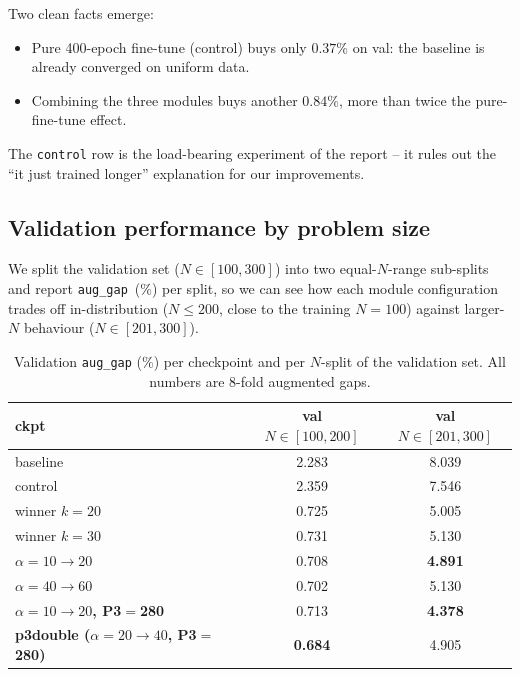 \documentclass[11pt,a4paper]{article}
\begin{document}
Two clean facts emerge:
%
\begin{itemize}
  \item Pure 400-epoch fine-tune (control) buys only $0.37\%$ on val: the
        baseline is already converged on uniform data.
  \item Combining the three modules buys another $0.84\%$, more than twice
        the pure-fine-tune effect.
\end{itemize}
%
The \texttt{control} row is the load-bearing experiment of the report -- it
rules out the ``it just trained longer'' explanation for our improvements.

\subsection{Validation performance by problem size}
\label{sec:bucket}

We split the validation set ($N\!\in\![100,300]$) into two
equal-$N$-range sub-splits and report \texttt{aug\_gap}~($\%$) per split,
so we can see how each module configuration trades off in-distribution
($N\!\le\!200$, close to the training $N\!=\!100$) against larger-$N$
behaviour ($N\!\in\![201,300]$).

\begin{table}[t]
\centering
\caption{Validation \texttt{aug\_gap} ($\%$) per checkpoint and per
$N$-split of the validation set. All numbers are 8-fold augmented gaps.}
\label{tab:bucket}
\small
\begin{tabular}{l c c}
\toprule
ckpt                    & val $N\!\in\![100,200]$ & val $N\!\in\![201,300]$ \\
\midrule
baseline                & 2.283 & 8.039 \\
control                 & 2.359 & 7.546 \\
\midrule
winner $k\!=\!20$       & 0.725 & 5.005 \\
winner $k\!=\!30$       & 0.731 & 5.130 \\
$\alpha\!=\!10\!\to\!20$ & 0.708 & \textbf{4.891} \\
$\alpha\!=\!40\!\to\!60$ & 0.702 & 5.130 \\
\rowcolor{sdmblue!10}
\textbf{$\alpha\!=\!10\!\to\!20$, P3$=$280} & 0.713 & \textbf{4.378} \\
\textbf{p3double ($\alpha\!=\!20\!\to\!40$, P3$=$280)} & \textbf{0.684} & 4.905 \\
\bottomrule
\end{tabular}
\end{table}
\end{document}
